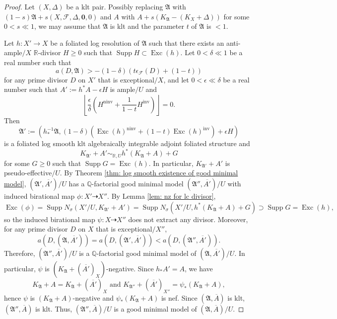 \documentclass[12pt]{amsart}
\numberwithin{equation}{section}
\newcommand{\Rr}{\mathbb{R}}
\newcommand{\Exc}{\operatorname{Exc}}
\newcommand{\ninv}{\operatorname{ninv}}
\newcommand{\inv}{\operatorname{inv}}
\newcommand{\Supp}{\operatorname{Supp}}
\newcommand{\Aa}{{\mathfrak{A}}}
\newcommand{\Ff}{\mathcal{F}}
\theoremstyle{definition}
\theoremstyle{definition}
\theoremstyle{definition}
\begin{document}
\begin{proof}
 Let $(X,\Delta)$ be a klt pair. Possibly replacing $\Aa$ with $(1-s)\Aa+s(X,\Ff,\Delta,\bm{0},0)$ and $A$ with $A+s(K_{\Aa}-(K_X+\Delta))$ for some $0<s\ll 1$, we may assume that $\Aa$ is klt and the parameter $t$ of $\Aa$ is $<1$.
 
 Let $h: X'\rightarrow X$ be a foliated log resolution of $\Aa$ such that there exists an anti-ample$/X$ $\Rr$-divisor $H\geq 0$ such that $\Supp H\subset\Exc(h)$. Let $0<\delta\ll 1$ be a real number such that $$a(D,\Aa)>-(1-\delta)(t\epsilon_{\Ff}(D)+(1-t))$$
for any prime divisor $D$ on $X'$ that is exceptional$/X$, and let $0<\epsilon\ll\delta$ be a real number such that $A':=h^*A-\epsilon H$ is ample$/U$ and 
$$\left\lfloor\frac{\epsilon}{\delta}\left(H^{\ninv}+\frac{1}{1-t}H^{\inv}\right)\right\rfloor=0.$$
Then
 $$\Aa':=(h^{-1}_*\Aa,(1-\delta)(\Exc(h)^{\ninv}+(1-t)\Exc(h)^{\inv})+\epsilon H)$$
 is a foliated log smooth klt algebraically integrable adjoint foliated structure and
 $$K_{\Aa'}+A'\sim_{\mathbb R,U}h^*(K_{\Aa}+A)+G$$
 for some $G\geq 0$ such that $\Supp G=\Exc(h)$. In particular, $K_{\Aa'}+A'$ is pseudo-effective$/U$. By Theorem \ref{thm: log smooth existence of good minimal model}, $(\Aa',\overline{A'})/U$ has a $\mathbb Q$-factorial good minimal model $(\Aa'',\overline{A'})/U$ with induced birational map $\phi: X'\dashrightarrow X''$. By Lemma \ref{lem: nz for lc divisor},
 $$\Exc(\phi)=\Supp N_{\sigma}(X'/U,K_{\Aa'}+A')=\Supp N_{\sigma}(X'/U,h^*(K_{\Aa}+A)+G)\supset\Supp G=\Exc(h),$$ so the induced birational map $\psi: X\dashrightarrow X''$ does not extract any divisor. Moreover, for any prime divisor $D$ on $X$ that is exceptional$/X''$, 
 $$a(D,(\Aa,\overline{A'}))=a(D,(\Aa',\overline{A'}))<a(D,(\Aa'',\overline{A'})).$$ 
 Therefore, $(\Aa'',\overline{A'})/U$ is a $\mathbb Q$-factorial good minimal model of $(\Aa,\overline{A'})/U$. In particular, $\psi$ is $(K_{\Aa}+(\overline{A'})_{X})$-negative. Since $h_*A'=A$, we have
 $$K_{\Aa}+A=K_{\Aa}+(\overline{A'})_{X}\text{ and }K_{\Aa''}+(\overline{A'})_{X''}=\psi_*(K_{\Aa}+A),$$
 hence $\psi$ is $(K_{\Aa}+A)$-negative and $\psi_*(K_{\Aa}+A)$ is nef. Since $(\Aa,\overline{A})$ is klt, $(\Aa'',\overline{A})$ is klt. Thus, $(\Aa'',\overline{A})/U$ is a good minimal model of $(\Aa,\overline{A})/U$. 
\end{proof}
\end{document}
